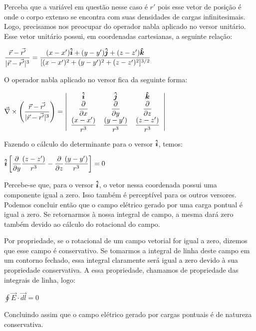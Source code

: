 \documentclass[11pt,a4paper]{article}
\newcommand{\mat}[1]{\mbox{\boldmath{$#1$}}}
\begin{document}
\begin{enumerate}
Perceba que a variável em questão nesse caso é $r'$ pois esse vetor de posição é onde o corpo extenso se encontra com suas densidades de cargas infinitesimais. Logo, precisamos nos preocupar do operador nabla aplicado no versor unitário. Esse vetor unitário possui, em coordenadas cartesianas, a seguinte relação:

\begin{center}
$\displaystyle\dfrac{\vec{r} - \vec{r'}}{|\vec{r} - \vec{r'}|^3} = \displaystyle\dfrac{(x - x')\mat{\hat{i}} + (y - y')\mat{\hat{j}} + (z - z')\mat{\hat{k}}}{[(x - x')^2 + (y - y')^2 + (z - z')^2]^{3/2}}$
\end{center}

O operador nabla aplicado no versor fica da seguinte forma: 

\begin{center}
$\vec{\nabla} \times \left(\displaystyle\dfrac{\vec{r} - \vec{r'}}{|\vec{r} - \vec{r'}|^3}\right) = \left| \begin{array}{ccc}
\mat{\hat{i}} & \mat{\hat{j}}  & \mat{\hat{k}} \\ 
 \displaystyle\dfrac{\partial}{\partial x} & \displaystyle\dfrac{\partial}{\partial y} & \displaystyle\dfrac{\partial}{\partial z}\\
 \displaystyle\dfrac{(x - x')}{r^3} & \displaystyle\dfrac{(y - y')}{r^3}  & \displaystyle\dfrac{(z - z')}{r^3}
\end{array} \right|$

\end{center}

Fazendo o cálculo do determinante para o versor $\mat{\hat{i}}$, temos:

\begin{center}
$\mat{\hat{i}} \left[\displaystyle\dfrac{\partial}{\partial y} \displaystyle\dfrac{(z - z')}{r^3} - \displaystyle\dfrac{\partial}{\partial z} \displaystyle\dfrac{(y - y')}{r^3} \right] = 0$
\end{center}

Percebe-se que, para o versor $\mat{\hat{i}}$, o vetor nessa coordenada possui uma componente igual a zero. Isso também é perceptível para os outros versores. Podemos concluir então que o campo elétrico gerado por uma carga pontual é igual a zero. Se retornarmos à nossa integral de campo, a mesma dará zero também devido ao cálculo do rotacional do campo. 

Por propriedade, se o rotacional de um campo vetorial for igual a zero, dizemos que esse campo é conservativo. Se tomarmos a integral de linha deste campo em um contorno fechado, essa integral claramente será igual a zero devido à sua propriedade conservativa. A essa propriedade, chamamos de propriedade das integrais de linha, logo: 

\begin{center}
$\displaystyle\oint \vec{E} \cdot \vec{dl} = 0$
\end{center}

Concluindo assim que o campo elétrico gerado por cargas pontuais é de natureza conservativa.

\end{enumerate}
	
\end{document}
